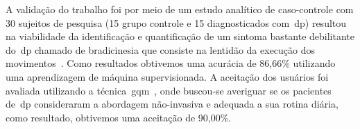 A validação do trabalho foi por meio de um estudo analítico de caso-controle com 30 sujeitos de pesquisa (15 grupo controle e 15 diagnosticados com~\ac{dp}) resultou na viabilidade da identificação e quantificação de um sintoma bastante debilitante do~\ac{dp} chamado de bradicinesia que consiste na lentidão da execução dos movimentos~\cite{protpar010}. Como resultados obtivemos uma acurácia de 86,66\%  utilizando uma aprendizagem de máquina supervisionada. A aceitação dos usuários foi avaliada utilizando a técnica~\ac{gqm}~\cite{van1999goal}, onde buscou-se averiguar se os pacientes de~\ac{dp} consideraram a abordagem não-invasiva e adequada a sua rotina diária, como resultado, obtivemos uma aceitação de 90,00\%.












